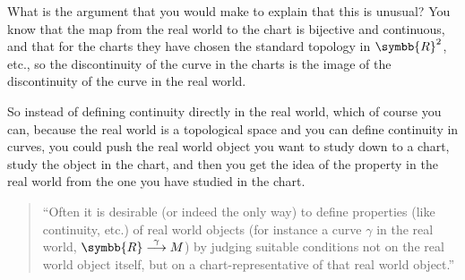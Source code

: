 What is the argument that you would make to explain that this is unusual? You know that the map
from the real world to the chart is bijective and continuous, and that for the charts they have
chosen the standard topology in $\symbb{R}^2$, etc., so the discontinuity of the curve in the
charts is the image of the discontinuity of the curve in the real world.

So instead of defining continuity directly in the real world, which of course you can, because the
real world is a topological space and you can define continuity in curves, you could push the real
world object you want to study down to a chart, study the object in the chart, and then you get the
idea of the property in the real world from the one you have studied in the chart.

\begin{quote}
  ``Often it is desirable (or indeed the only way) to define properties (like continuity, etc.) of
  real world objects (for instance a curve $\gamma$ in the real world,
  $\symbb{R} \overset{\gamma}{\longrightarrow} M$) by judging suitable conditions not on
  the real world object itself, but on a chart-representative of that real world object.''
\end{quote}

